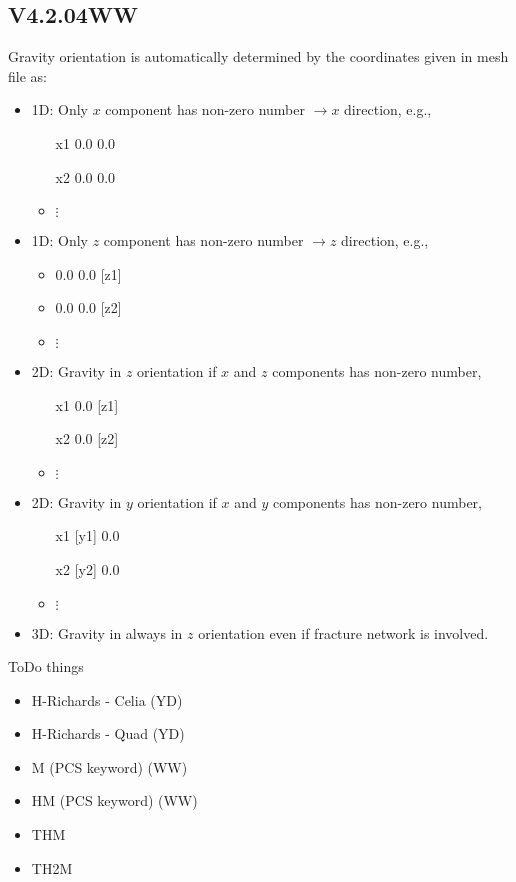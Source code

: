 \subsection{V4.2.04WW}
Gravity orientation is automatically determined by the coordinates 
given  in mesh file as: 
\begin{itemize}
  \item 1D: Only $x$ component has non-zero number $\longrightarrow x$  direction, e.g.,   
           \begin{itemize}
            \item   [x1] 0.0 0.0
            \item   [x2] 0.0 0.0   
            \item  $\vdots$
           \end{itemize}
              
  \item 1D:  Only $z$ component has non-zero number $\longrightarrow z$  direction, e.g.,  
            \begin{itemize}
            \item   0.0 0.0 [z1]
            \item   0.0 0.0 [z2]  
            \item  $\vdots$
           \end{itemize}
  \item 2D:  Gravity in $z$ orientation if $x$ and $z$ components has non-zero number,  
            \begin{itemize}
            \item  [x1] 0.0 [z1]
            \item  [x2] 0.0 [z2]  
            \item  $\vdots$
           \end{itemize}
  \item 2D:  Gravity in $y$ orientation if $x$ and $y$ components has non-zero number,  
            \begin{itemize}
            \item  [x1] [y1]  0.0
            \item  [x2] [y2]  0.0 
            \item  $\vdots$
            \end{itemize}

 \item 3D:  Gravity in always in $z$ orientation even if fracture network is involved.  
\end{itemize}




ToDo things
\begin{itemize}
    \item H-Richards - Celia (YD)
    \item H-Richards - Quad (YD)
    \item M (PCS keyword) (WW)
    \item HM (PCS keyword) (WW)
    \item THM
    \item TH2M
\end{itemize}

